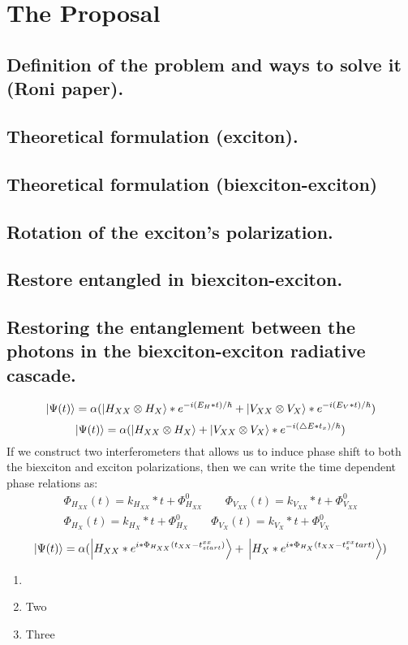 \section{The Proposal}
\subsection{Definition of the problem and ways to solve it (Roni paper).}
\subsection{Theoretical formulation (exciton).}
\subsection{Theoretical formulation (biexciton-exciton)}

\subsection{Rotation of the exciton's polarization.}
\subsection{Restore entangled in biexciton-exciton.}
\subsection{Restoring the entanglement between the photons in the biexciton-exciton radiative cascade.}
	\begin{equation}
	\ket{\Psi(t)} = \alpha(\ket{H_{XX} \otimes  H_X}*e^{-i(E_H*t)/\hbar}+\ket{V_{XX}\otimes V_X}*e^{-i(E_V*t)/\hbar})
\end{equation}
\begin{equation}
	\ket{\Psi(t)} = \alpha(\ket{H_{XX} \otimes H_X}+\ket{V_{XX}\otimes V_X}*e^{-i(\triangle E*t_x)/\hbar})
\end{equation}
If we construct two interferometers that allows us to induce phase shift to both the biexciton and exciton polarizations, then we can write the time dependent phase relations as: 
\begin{equation}
\begin{aligned} 
		\Phi_{H_{XX}}{(t)} = k_{H_{XX}}*t + \Phi^0_{H_{XX}} \qquad 	\Phi_{V_{XX}}{(t)} = k_{V_{XX}}*t + \Phi^0_{V_{XX}} \\
		\Phi_{H_{X}}{(t)} = k_{H_{X}}*t + \Phi^0_{H_{X}} \qquad
		 \Phi_{V_{X}}{(t)} = k_{V_{X}}*t + \Phi^0_{V_{X}} 
\end{aligned}
\end{equation}
\begin{equation}
		\ket{\Psi(t)}=\\ \alpha(\ket{H_{XX}*e^{i*\Phi_{H_{XX}}(t_{XX}-t^{xx}_{start})}}+ \\
		\ket{H_{X}*e^{i*\Phi_{H_{X}}(t_{XX}-t^{xx}_start)}})				
\end{equation} 
\begin{enumerate}
	\item 
	\item  Two
	\item  Three
\end{enumerate}
